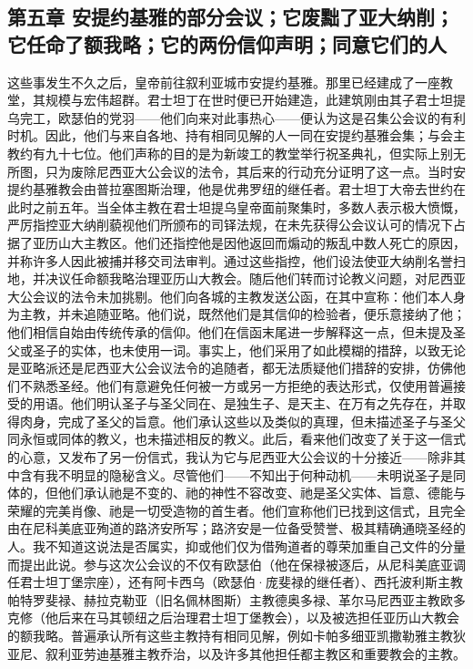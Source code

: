 
\subsection{第五章 安提约基雅的部分会议；它废黜了亚大纳削；它任命了额我略；它的两份信仰声明；同意它们的人}

这些事发生不久之后，皇帝前往叙利亚城市安提约基雅。那里已经建成了一座教堂，其规模与宏伟超群。君士坦丁在世时便已开始建造，此建筑刚由其子君士坦提乌完工，欧瑟伯的党羽——他们向来对此事热心——便认为这是召集公会议的有利时机。因此，他们与来自各地、持有相同见解的人一同在安提约基雅会集；与会主教约有九十七位。他们声称的目的是为新竣工的教堂举行祝圣典礼，但实际上别无所图，只为废除尼西亚大公会议的法令，其后来的行动充分证明了这一点。当时安提约基雅教会由普拉塞图斯治理，他是优弗罗纽的继任者。君士坦丁大帝去世约在此时之前五年。当全体主教在君士坦提乌皇帝面前聚集时，多数人表示极大愤慨，严厉指控亚大纳削藐视他们所颁布的司铎法规，在未先获得公会议认可的情况下占据了亚历山大主教区。他们还指控他是因他返回而煽动的叛乱中数人死亡的原因，并称许多人因此被捕并移交司法审判。通过这些指控，他们设法使亚大纳削名誉扫地，并决议任命额我略治理亚历山大教会。随后他们转而讨论教义问题，对尼西亚大公会议的法令未加挑剔。他们向各城的主教发送公函，在其中宣称：他们本人身为主教，并未追随亚略。他们说，既然他们是其信仰的检验者，便乐意接纳了他；他们相信自始由传统传承的信仰。他们在信函末尾进一步解释这一点，但未提及圣父或圣子的实体，也未使用一词。事实上，他们采用了如此模糊的措辞，以致无论是亚略派还是尼西亚大公会议法令的追随者，都无法质疑他们措辞的安排，仿佛他们不熟悉圣经。他们有意避免任何被一方或另一方拒绝的表达形式，仅使用普遍接受的用语。他们明认圣子与圣父同在、是独生子、是天主、在万有之先存在，并取得肉身，完成了圣父的旨意。他们承认这些以及类似的真理，但未描述圣子与圣父同永恒或同体的教义，也未描述相反的教义。此后，看来他们改变了关于这一信式的心意，又发布了另一份信式，我认为它与尼西亚大公会议的十分接近——除非其中含有我不明显的隐秘含义。尽管他们——不知出于何种动机——未明说圣子是同体的，但他们承认祂是不变的、祂的神性不容改变、祂是圣父实体、旨意、德能与荣耀的完美肖像、祂是一切受造物的首生者。他们宣称他们已找到这信式，且完全由在尼科美底亚殉道的路济安所写；路济安是一位备受赞誉、极其精确通晓圣经的人。我不知道这说法是否属实，抑或他们仅为借殉道者的尊荣加重自己文件的分量而提出此说。参与这次公会议的不仅有欧瑟伯（他在保禄被逐后，从尼科美底亚调任君士坦丁堡宗座），还有阿卡西乌（欧瑟伯·庞斐禄的继任者）、西托波利斯主教帕特罗斐禄、赫拉克勒亚（旧名佩林图斯）主教德奥多禄、革尔马尼西亚主教欧多克修（他后来在马其顿纽之后治理君士坦丁堡教会），以及被选担任亚历山大教会的额我略。普遍承认所有这些主教持有相同见解，例如卡帕多细亚凯撒勒雅主教狄亚尼、叙利亚劳迪基雅主教乔治，以及许多其他担任都主教区和重要教会的主教。\par

